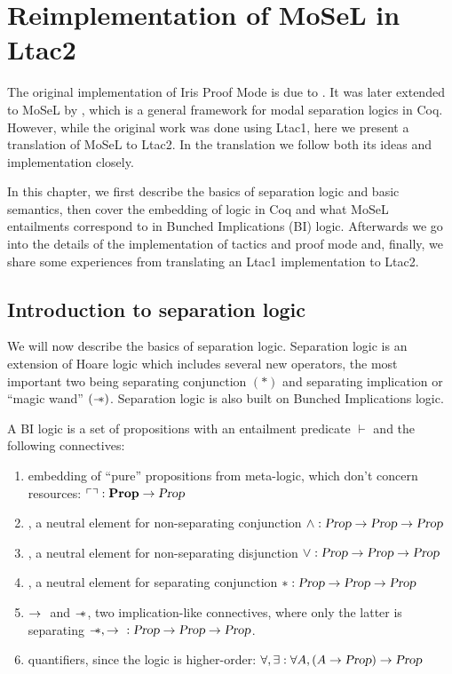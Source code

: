 \chapter{Reimplementation of MoSeL in Ltac2}
\label{chap:reimplementation_ipm}

The original implementation of Iris Proof Mode is due to \citet{krebbersInteractiveProofsHigherorder2017}.
It was later extended to MoSeL by \citet{krebbersMoSeLGeneralExtensible2018}, which is a general framework for modal separation logics in Coq.
However, while the original work was done using Ltac1, here we present a translation of MoSeL to Ltac2.
In the translation we follow both its ideas and implementation closely.

In this chapter, we first describe the basics of separation logic and basic semantics, then cover the embedding of logic in Coq and what MoSeL entailments correspond to in Bunched Implications (BI) logic.
Afterwards we go into the details of the implementation of tactics and proof mode and, finally, we share some experiences from translating an Ltac1 implementation to Ltac2.

\section{Introduction to separation logic}
\label{sec:separation-logic-intro}

We will now describe the basics of separation logic.
Separation logic is an extension of Hoare logic which includes several new operators, the most important two being separating conjunction \((*)\) and separating implication or ``magic wand'' \((\mathrel{-\mkern-6mu*})\).
Separation logic is also built on Bunched Implications logic.

A BI logic is a set of propositions \Prop with an entailment predicate \(\vdash\) and the following connectives:
\begin{enumerate}
\item embedding of ``pure'' propositions from meta-logic, which don't concern resources: \(\ulcorner   \urcorner : \textbf{Prop} \to \textsl{Prop}\)
\item \True, a neutral element for non-separating conjunction \(\wedge : \textsl{Prop} \to \textsl{Prop} \to \textsl{Prop}\)
\item \False, a neutral element for non-separating disjunction \(\vee : \textsl{Prop} \to \textsl{Prop} \to \textsl{Prop}\)
\item \emp, a neutral element for separating conjunction \(* : \textsl{Prop} \to \textsl{Prop} \to \textsl{Prop}\)
\item \(\mathbin{\rightarrow}~\) and \(\mathrel{-\mkern-6mu*}\), two implication-like connectives, where only the latter is separating \(\mathrel{-\mkern-6mu*}, \mathbin{\rightarrow}~ : \textsl{Prop} \to \textsl{Prop} \to \textsl{Prop}\).
\item quantifiers, since the logic is higher-order: \(\forall, \exists : \forall A, (A \to \textsl{Prop}) \to \textsl{Prop}\)
\end{enumerate}

